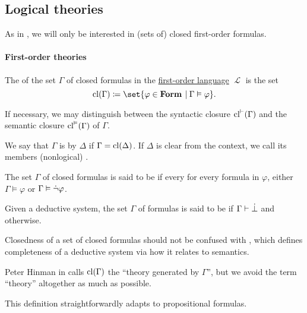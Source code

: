 \subsection{Logical theories}\label{subsec:logical_theories}

As in , we will only be interested in (sets of) closed first-order formulas.

\paragraph{First-order theories}

\begin{definition}\label{def:first_order_theory}
  The  of the set \( \Gamma \) of closed formulas in the \hyperref[def:first_order_language]{first-order language} \( \mscrL \) is the set
  \begin{equation*}
    \cl(\Gamma) \coloneqq \set{ \varphi \in \boldop{Form} \given \Gamma \vDash \varphi }.
  \end{equation*}

  If necessary, we may distinguish between the syntactic closure \( \operatorname{cl}^\vdash(\Gamma) \) and the semantic closure \( \operatorname{cl}^\vDash(\Gamma) \) of \( \Gamma \).

  \begin{thmenum}
     We say that \( \Gamma \) is  by \( \Delta \) if \( \Gamma = \operatorname{cl}(\Delta) \). If \( \Delta \) is clear from the context, we call its members (nonlogical) .

    \medskip

     The set \( \Gamma \) of closed formulas is said to be  if every for every formula in \( \varphi \), either \( \Gamma \vDash \varphi \) or \( \Gamma \vDash \dot\neg \varphi \).

     Given a deductive system, the set \( \Gamma \) of formulas is said to be  if \( \Gamma \vdash \dot\bot \) and  otherwise.
  \end{thmenum}
\end{definition}
\begin{comments}
  \item Closedness of a set of closed formulas should not be confused with , which defines completeness of a deductive system via how it relates to semantics.

  \item Peter Hinman in  calls \( \operatorname{cl}(\Gamma) \) the \enquote{theory generated by \( \Gamma \)}, but we avoid the term \enquote{theory} altogether as much as possible.

  \item This definition straightforwardly adapts to propositional formulas.
\end{comments}

